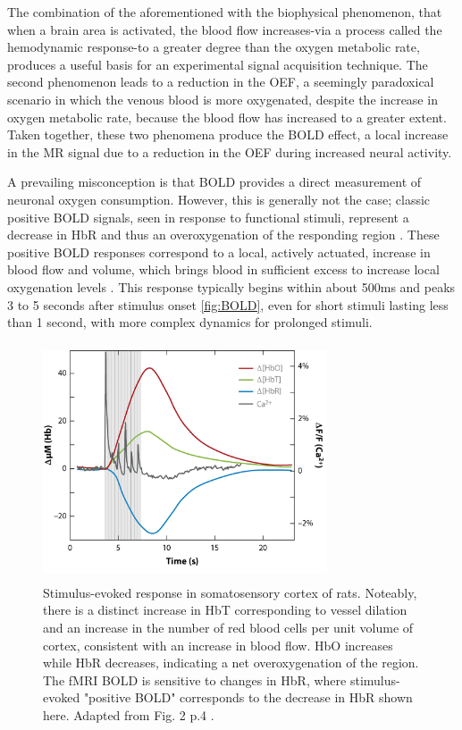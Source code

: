 The combination of the aforementioned with the biophysical phenomenon, that when a brain area is activated, the blood flow increases-via a process called the hemodynamic response-to a greater degree than the oxygen metabolic rate, produces a useful basis for an experimental signal acquisition technique. The second phenomenon leads to a reduction in the \gls{OEF}, a seemingly paradoxical scenario in which the venous blood is more oxygenated, despite the increase in oxygen metabolic rate, because the blood flow has increased to a greater extent. Taken together, these two phenomena produce the \gls{BOLD} effect, a local increase in the \gls{MR} signal due to a reduction in the \gls{OEF} during increased neural activity. \cite{Buxton2013}

A prevailing misconception is that \gls{BOLD} provides a direct measurement of neuronal oxygen consumption. However, this is generally not the case; classic positive \gls{BOLD} signals, seen in response to functional stimuli, represent a decrease in \gls{HbR} and thus an overoxygenation of the responding region \cite{Attwell2002}. These positive \gls{BOLD} responses correspond to a local, actively actuated, increase in blood flow and volume, which brings blood in sufficient excess to increase local oxygenation levels \cite{Raichle1998}. This response typically begins within about 500ms and peaks 3 to 5 seconds after stimulus onset \autoref{fig:BOLD}, even for short stimuli lasting less than 1 second, with more complex dynamics for prolonged stimuli.

\begin{figure}[htbp]
    \centering
    \includegraphics[width = 0.75\textwidth, height = 7cm]{assets/images/Hb_flactuations_BOLD.jpg}
    \caption[Stimulus-evoked Response in Somatosensory Cortex of Rats]{Stimulus-evoked response in somatosensory cortex of rats. Noteably, there is a distinct increase in \gls{HbT} corresponding to vessel dilation and an increase in the number of red blood cells per unit volume of cortex, consistent with an increase in blood flow. \gls{HbO} increases while \gls{HbR} decreases, indicating a net overoxygenation of the region. The \gls{fMRI} \gls{BOLD} is sensitive to changes in \gls{HbR}, where stimulus-evoked "positive \gls{BOLD}" corresponds to the decrease in \gls{HbR} shown here. Adapted from Fig. 2 p.4 .}
    \label{fig:BOLD}
\end{figure}

